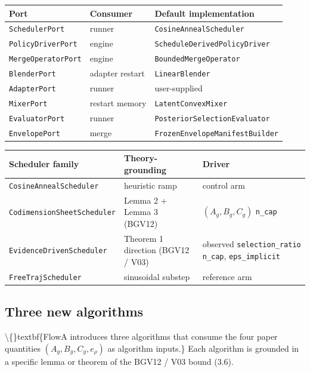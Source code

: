 \documentclass[preprint,3p,times,twocolumn]{elsarticle}
\begin{document}
\begin{table}[ht]
\centering
\small
\begin{tabular}{lll}
\hline
\textbf{Port} & \textbf{Consumer} & \textbf{Default implementation} \\
\hline
\texttt{SchedulerPort} & runner & \texttt{CosineAnnealScheduler} \\
\texttt{PolicyDriverPort} & engine & \texttt{ScheduleDerivedPolicyDriver} \\
\texttt{MergeOperatorPort} & engine & \texttt{BoundedMergeOperator} \\
\texttt{BlenderPort} & adapter restart & \texttt{LinearBlender} \\
\texttt{AdapterPort} & runner & user-supplied \\
\texttt{MixerPort} & restart memory & \texttt{LatentConvexMixer} \\
\texttt{EvaluatorPort} & runner & \texttt{PosteriorSelectionEvaluator} \\
\texttt{EnvelopePort} & merge & \texttt{FrozenEnvelopeManifestBuilder} \\
\hline
\end{tabular}
\end{table}

\begin{table}[ht]
\centering
\small
\begin{tabular}{lll}
\hline
\textbf{Scheduler family} & \textbf{Theory-grounding} & \textbf{Driver} \\
\hline
\texttt{CosineAnnealScheduler} & heuristic ramp & control arm \\
\texttt{CodimensionSheetScheduler} & Lemma 2 + Lemma 3 (BGV12) & $(A_g, B_g, C_g)$  \texttt{n\_cap} \\
\texttt{EvidenceDrivenScheduler} & Theorem 1 direction (BGV12 / V03) & observed \texttt{selection\_ratio}  \texttt{n\_cap}, \texttt{eps\_implicit} \\
\texttt{FreeTrajScheduler} & sinusoidal substep & reference arm \\
\hline
\end{tabular}
\end{table}

\subsection{Three new algorithms}
\textbackslash\{\}textbf\{FlowA introduces three algorithms that consume the four paper quantities $(A_g, B_g, C_g, e_\rho)$ as algorithm inputs.\} Each algorithm is grounded in a specific lemma or theorem of the BGV12 / V03 bound (3.6).
\end{document}
